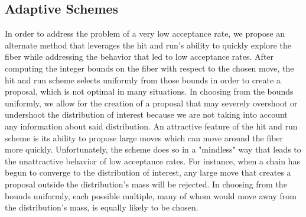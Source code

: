 \documentclass{phd}\usepackage[]{graphicx}\usepackage[]{color}
\makeatletter
\newenvironment{kframe}{%
 \def\at@end@of@kframe{}%
 \ifinner\ifhmode%
  \def\at@end@of@kframe{\end{minipage}}%
  \begin{minipage}{\columnwidth}%
 \fi\fi%
 \def\FrameCommand##1{\hskip\@totalleftmargin \hskip-\fboxsep
 \colorbox{shadecolor}{##1}\hskip-\fboxsep
     \hskip-\linewidth \hskip-\@totalleftmargin \hskip\columnwidth}%
 \MakeFramed {\advance\hsize-\width
   \@totalleftmargin\z@ \linewidth\hsize
   \@setminipage}}%
 {\par\unskip\endMakeFramed%
 \at@end@of@kframe}
\newenvironment{knitrout}{}{} %
\makeatother
\begin{document}
\begin{knitrout}
\color{fgcolor}\begin{kframe}


{\ttfamily\noindent\bfseries\color{errorcolor}{\#\# Error in metropolis(tbl, moves, suffStats = suff\_stats, config = A): unused arguments (suffStats = suff\_stats, config = A)}}

{\ttfamily\noindent\bfseries\color{errorcolor}{\#\# Error in metropolis(tbl, moves, suffStats = suff\_stats, config = A, hitAndRun = TRUE): unused arguments (suffStats = suff\_stats, config = A, hitAndRun = TRUE)}}

{\ttfamily\noindent\bfseries\color{errorcolor}{\#\# Error in summary(base\_acceptprob): object 'base\_acceptprob' not found}}

{\ttfamily\noindent\bfseries\color{errorcolor}{\#\# Error in summary(har\_acceptprob): object 'har\_acceptprob' not found}}\end{kframe}
\end{knitrout}
\subsection{Adaptive Schemes}
In order to address the problem of a very low acceptance rate, we propose an alternate method that leverages the hit and run's ability to quickly explore the fiber while addressing the behavior that led to low acceptance rates. After computing the integer bounds on the fiber with respect to the chosen move, the hit and run scheme selects uniformly from those bounds in order to create a proposal, which is not optimal in many situations. In choosing from the bounds uniformly, we allow for the creation of a proposal that may severely overshoot or undershoot the distribution of interest because we are not taking into account any information about said distribution. An attractive feature of the hit and run scheme is its ability to propose large moves which can move around the fiber more quickly. Unfortunately, the scheme does so in a "mindless" way that leads to the unattractive behavior of low acceptance rates. For instance, when a chain has begun to converge to the distribution of interest, any large move that creates a proposal outside the distribution's mass will be rejected. In choosing from the bounds uniformly, each possible multiple, many of whom would move away from the distribution's mass, is equally likely to be chosen.
\end{document}
